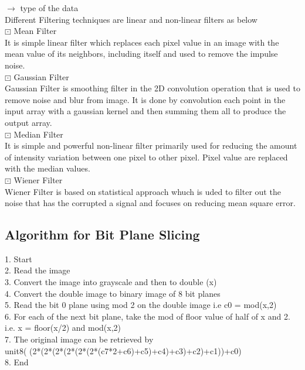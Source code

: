 \documentclass[12pt]{article}
\begin{document}
$\rightarrow$ \quad type of the data\\
Different Filtering techniques are linear and non-linear filters as below\\
$\boxdot$ Mean Filter\\
\quad \quad It is simple linear filter which replaces each pixel value in an image with the mean value of its neighbors, including itself and used to remove the impulse noise.\\
$\boxdot$ Gaussian Filter\\
\quad \quad Gaussian Filter is smoothing filter in the 2D convolution operation that is used to remove noise and blur from image. It is done by convolution each point in the input array with a gaussian kernel and then summing them all to produce the output array.\\
$\boxdot$ Median Filter\\
\quad \quad It is simple and powerful non-linear filter primarily used for reducing the amount of intensity variation between one pixel to other pixel. Pixel value are replaced with the median values.\\
$\boxdot$ Wiener Filter\\
\quad \quad Wiener Filter is based on statistical approach whuch is uded to filter out the noise that has the corrupted a signal and focuses on reducing mean square error.\\
\subsection{Algorithm for Bit Plane Slicing}
1. Start\\
2. Read the image\\
3. Convert the image into grayscale and then to double (x)\\
4. Convert the double image to binary image of 8 bit planes\\
5. Read the bit 0 plane using mod 2 on the double image i.e c0 = mod(x,2)\\
6. For each of the next bit plane, take the mod of floor value of half of x and 2. i.e. x = floor(x/2) and mod(x,2)\\
7. The original image can be retrieved by\\
     unit8( (2*(2*(2*(2*(2*(2*(c7*2+c6)+c5)+c4)+c3)+c2)+c1))+c0)\\
8. End
\end{document}
